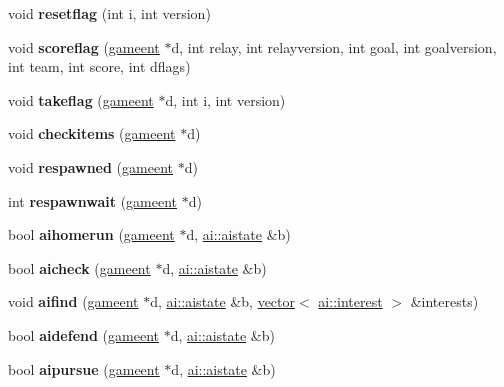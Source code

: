 \begin{DoxyCompactItemize}
void {\bfseries resetflag} (int i, int version)
\item 
\mbox{\label{structctfclientmode_a2cdc56863992c99ce8f770bd7b89af3c}} 
void {\bfseries scoreflag} (\hyperlink{structgameent}{gameent} $\ast$d, int relay, int relayversion, int goal, int goalversion, int team, int score, int dflags)
\item 
\mbox{\label{structctfclientmode_aadd04582ad24796437b9a6b3d33436bd}} 
void {\bfseries takeflag} (\hyperlink{structgameent}{gameent} $\ast$d, int i, int version)
\item 
\mbox{\label{structctfclientmode_a121eda171cadb8f07283d96dafaf1b5c}} 
void {\bfseries checkitems} (\hyperlink{structgameent}{gameent} $\ast$d)
\item 
\mbox{\label{structctfclientmode_a8baa46f221c027ab6a0c7fcf1c10b0df}} 
void {\bfseries respawned} (\hyperlink{structgameent}{gameent} $\ast$d)
\item 
\mbox{\label{structctfclientmode_a91e1fa701790d4fadd989270f43f82e5}} 
int {\bfseries respawnwait} (\hyperlink{structgameent}{gameent} $\ast$d)
\item 
\mbox{\label{structctfclientmode_a08bc510c01a160bdc1866759de0ae593}} 
bool {\bfseries aihomerun} (\hyperlink{structgameent}{gameent} $\ast$d, \hyperlink{structai_1_1aistate}{ai\+::aistate} \&b)
\item 
\mbox{\label{structctfclientmode_a6f5742a1572cc75218a26779abf89d19}} 
bool {\bfseries aicheck} (\hyperlink{structgameent}{gameent} $\ast$d, \hyperlink{structai_1_1aistate}{ai\+::aistate} \&b)
\item 
\mbox{\label{structctfclientmode_a1affaf006ae7e9707ad028c4e25ad80a}} 
void {\bfseries aifind} (\hyperlink{structgameent}{gameent} $\ast$d, \hyperlink{structai_1_1aistate}{ai\+::aistate} \&b, \hyperlink{structvector}{vector}$<$ \hyperlink{structai_1_1interest}{ai\+::interest} $>$ \&interests)
\item 
\mbox{\label{structctfclientmode_a5b4bb6bf9553dffecaf1654ddd7bb791}} 
bool {\bfseries aidefend} (\hyperlink{structgameent}{gameent} $\ast$d, \hyperlink{structai_1_1aistate}{ai\+::aistate} \&b)
\item 
\mbox{\label{structctfclientmode_a3c8ef295a3df44919aca35b77d2ad7d3}} 
bool {\bfseries aipursue} (\hyperlink{structgameent}{gameent} $\ast$d, \hyperlink{structai_1_1aistate}{ai\+::aistate} \&b)
\end{DoxyCompactItemize}
